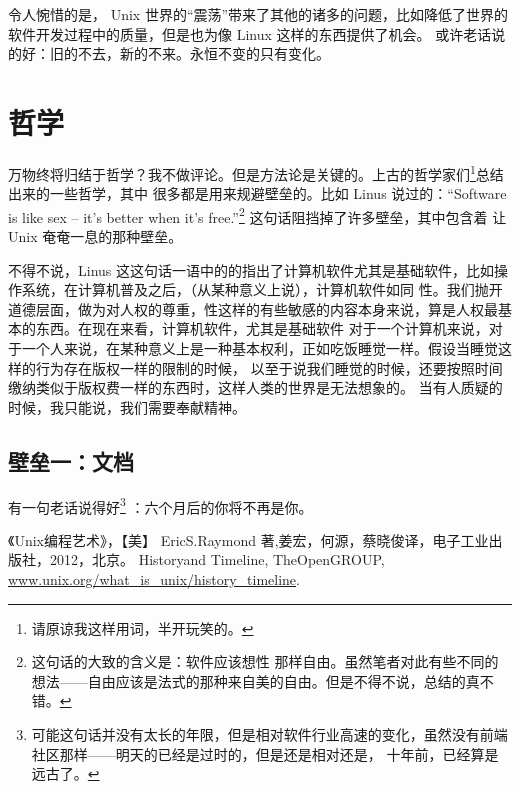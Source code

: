 \documentclass{ctexart}
\begin{document}
    令人惋惜的是， Unix 世界的“震荡”带来了其他的诸多的问题，比如降低了世界的软件开发过程中的质量，但是也为像 Linux 这样的东西提供了机会。
    或许老话说的好：旧的不去，新的不来。永恒不变的只有变化。

    \section{哲学}
    万物终将归结于哲学？我不做评论。但是方法论是关键的。上古的哲学家们\footnote{请原谅我这样用词，半开玩笑的。}总结出来的一些哲学，其中
    很多都是用来规避壁垒的。比如 Linus 说过的：“Software is like sex -- it's better when it's free.”\footnote{这句话的大致的含义是：软件应该想性
    那样自由。虽然笔者对此有些不同的想法——自由应该是法式的那种来自美的自由。但是不得不说，总结的真不错。} 这句话阻挡掉了许多壁垒，其中包含着 让
    Unix 奄奄一息的那种壁垒。

    不得不说，Linus 这这句话一语中的的指出了计算机软件尤其是基础软件，比如操作系统，在计算机普及之后，（从某种意义上说），计算机软件如同
    性。我们抛开道德层面，做为对人权的尊重，性这样的有些敏感的内容本身来说，算是人权最基本的东西。在现在来看，计算机软件，尤其是基础软件
    对于一个计算机来说，对于一个人来说，在某种意义上是一种基本权利，正如吃饭睡觉一样。假设当睡觉这样的行为存在版权一样的限制的时候，
    以至于说我们睡觉的时候，还要按照时间缴纳类似于版权费一样的东西时，这样人类的世界是无法想象的。
    当有人质疑的时候，我只能说，我们需要奉献精神。
    
    \subsection{壁垒一：文档}
    有一句老话说得好\footnote{可能这句话并没有太长的年限，但是相对软件行业高速的变化，虽然没有前端社区那样——明天的已经是过时的，但是还是相对还是，
        十年前，已经算是远古了。}
    ：六个月后的你将不再是你。
    

    \begin{thebibliography}{0}
        《Unix编程艺术》，【美】 Eric\space S.Raymond 著,姜宏，何源，蔡晓俊\space 译，电子工业出版社，2012，北京。
         History\space and \space Timeline, The\space Open\space GROUP,
        \href{http://www.unix.org/what_is_unix/history_timeline.html}{www.unix.org/what\_is\_unix/history\_timeline}.
    \end{thebibliography}
        
\end{document}
